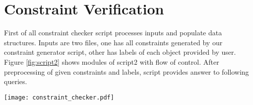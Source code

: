 \section{Constraint Verification}
First of all constraint checker script processes inputs and populate data structures. Inputs are two files, one has all constraints generated by our constraint generator script, other has labels of each object provided by user. Figure \ref{fig:script2} shows modules of script2 with flow of control. After preprocessing of given constraints and labels, script provides answer to following queries.\\ 
\begin{figure*}[ht]
	\texttt{[image: constraint\_checker.pdf]}
	\centering
	\caption{Block diagram of script2}
	\label{fig:script2}
\end{figure*}
